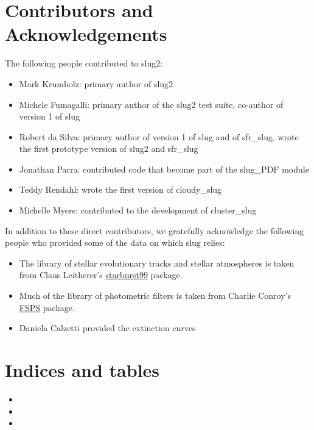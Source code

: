 \documentclass[letterpaper,10pt,english]{sphinxmanual}
\begin{document}
\chapter{Contributors and Acknowledgements}
\label{acknowledgements::doc}\label{acknowledgements:contributors-and-acknowledgements}
The following people contributed to slug2:
\begin{itemize}
\item {} 
Mark Krumholz: primary author of slug2

\item {} 
Michele Fumagalli: primary author of the slug2 test suite, co-author of version 1 of slug

\item {} 
Robert da Silva: primary author of version 1 of slug and of sfr\_slug, wrote the first prototype version of slug2 and sfr\_slug

\item {} 
Jonathan Parra: contributed code that become part of the slug\_PDF module

\item {} 
Teddy Rendahl: wrote the first version of cloudy\_slug

\item {} 
Michelle Myers: contributed to the development of cluster\_slug

\end{itemize}

In addition to these direct contributors, we gratefully acknowledge the following people who provided some of the data on which slug relies:
\begin{itemize}
\item {} 
The library of stellar evolutionary tracks and stellar atmospheres is taken from Claus Leitherer's \href{http://www.stsci.edu/science/starburst99/docs/default.htm}{starburst99} package.

\item {} 
Much of the library of photometric filters is taken from Charlie Conroy's \href{https://code.google.com/p/fsps/}{FSPS} package.

\item {} 
Daniela Calzetti provided the extinction curves

\end{itemize}


\chapter{Indices and tables}
\label{index:indices-and-tables}\begin{itemize}
\item {} 

\item {} 

\item {} 

\end{itemize}
\end{document}
